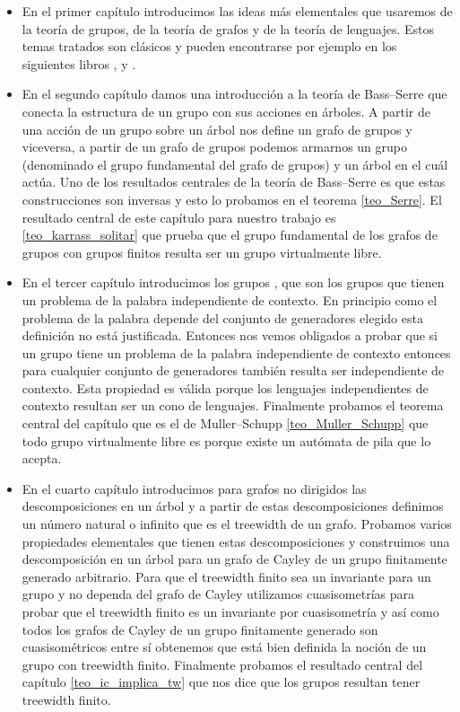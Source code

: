 \documentclass[tesis.tex]{subfiles}
\begin{document}
	\begin{itemize}
		\item 
			En el primer capítulo introducimos las ideas más elementales que usaremos de la teoría de grupos, de la teoría de grafos y de la teoría de lenguajes.
			Estos temas tratados son clásicos y pueden encontrarse por ejemplo en los siguientes libros \cite{lyndon1977combinatorial}, \cite{diestel2005graph} y \cite{hopcraft-ullman}.
		
		\item 
			En el segundo capítulo damos una introducción a la teoría de Bass--Serre que conecta la estructura de un grupo con sus acciones en árboles.
			A partir de una acción de un grupo sobre un árbol nos define un grafo de grupos y viceversa, a partir de un grafo de grupos podemos armarnos un grupo (denominado el grupo fundamental del grafo de grupos) y un árbol en el cuál actúa.
			Uno de los resultados centrales de la teoría de Bass--Serre es que estas construcciones son inversas y esto lo probamos en el teorema \ref{teo_Serre}.
			El resultado central de este capítulo para nuestro trabajo es \ref{teo_karrass_solitar} que prueba que el grupo fundamental de los grafos de grupos con grupos finitos resulta ser un grupo virtualmente libre.

		\item 
			En el tercer capítulo introducimos los grupos \ic, que son los grupos que tienen un problema de la palabra independiente de contexto. 
			En principio como el problema de la palabra depende del conjunto de generadores elegido esta definición no está justificada.
			Entonces nos vemos obligados a probar que si un grupo tiene un problema de la palabra independiente de contexto entonces para cualquier conjunto de generadores también resulta ser independiente de contexto.
			Esta propiedad es válida porque los lenguajes independientes de contexto resultan ser un cono de lenguajes.
			Finalmente probamos el teorema central del capítulo que es el de Muller--Schupp \ref{teo_Muller_Schupp} que todo grupo virtualmente libre es \ic porque existe un autómata de pila que lo acepta. 
			
			
		
		\item 
			En el cuarto capítulo introducimos para grafos no dirigidos las descomposiciones en un árbol y a partir de estas descomposiciones definimos un número natural o infinito que es el treewidth de un grafo.
			Probamos varios propiedades elementales que tienen estas descomposiciones y construimos una descomposición en un árbol para un grafo de Cayley de un grupo finitamente generado arbitrario.
			Para que el treewidth finito sea un invariante para un grupo y no dependa del grafo de Cayley utilizamos cuasisometrías para probar que el treewidth finito es un invariante por cuasisometría y así como todos los grafos de Cayley de un grupo finitamente generado son cuasisométricos entre sí obtenemos que está bien definida la noción de un grupo con treewidth finito.
			Finalmente probamos el resultado central del capítulo \ref{teo_ic_implica_tw} que nos dice que los grupos \ic resultan tener treewidth finito.
			

\end{itemize}
\end{document}
